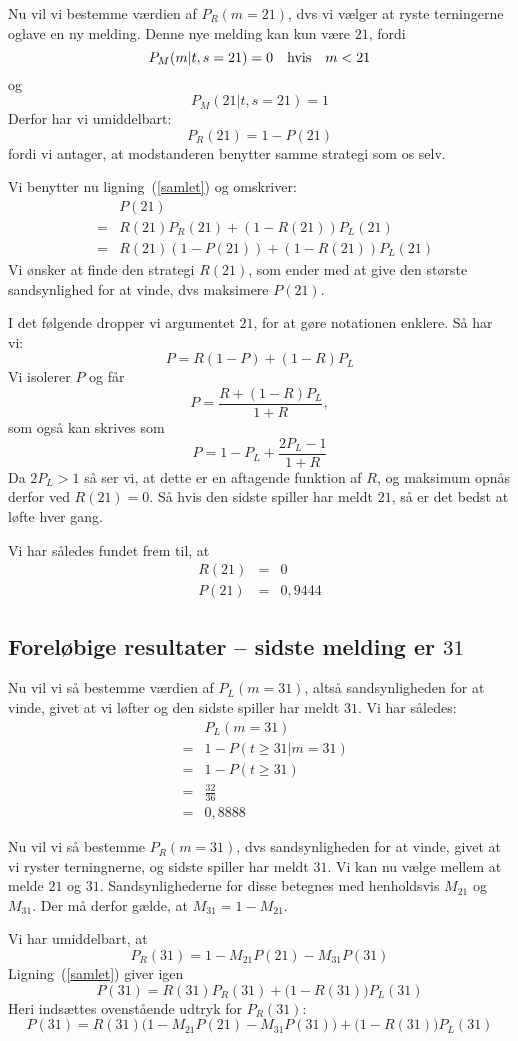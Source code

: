 \documentclass[12pt,oneside,a4paper]{article}
\newcommand{\bas}{\begin{eqnarray*}}
\newcommand{\eas}{\end{eqnarray*}}
\begin{document}
Nu vil vi bestemme værdien af $P_R(m=21)$, dvs vi vælger at ryste terningerne
oglave en ny melding. Denne nye melding kan kun være $21$,
fordi
$$
P_M(m|t, s=21) = 0 \quad {\rm hvis} \quad m < 21
$$
og
$$
P_M(21|t, s=21) = 1
$$
Derfor har vi umiddelbart:
$$
P_R(21) = 1 - P(21)
$$
fordi vi antager, at modstanderen benytter samme strategi som os selv.

Vi benytter nu ligning~(\ref{samlet}) og omskriver:
\bas
 && P(21) \\
&=& R(21) P_R(21) + (1-R(21)) P_L(21) \\ 
&=& R(21) (1-P(21)) + (1-R(21)) P_L(21)
\eas
Vi ønsker at finde den strategi $R(21)$, som ender med at give den største
sandsynlighed for at vinde, dvs maksimere $P(21)$.

I det følgende dropper vi argumentet $21$, for at gøre notationen enklere.
Så har vi:
$$
P = R(1-P) + (1-R)P_L
$$
Vi isolerer $P$ og får
$$
P = \frac{R+(1-R)P_L}{1+R},
$$
som også kan skrives som
$$
P = 1 - P_L + \frac{2P_L-1}{1+R}
$$
Da $2P_L>1$ så ser vi, at dette er en aftagende funktion af $R$, og maksimum
opnås derfor ved $R(21) = 0$. Så hvis den sidste spiller har meldt $21$, så er
det bedst at løfte hver gang.

Vi har således fundet frem til, at
\bas
R(21) &=& 0 \\
P(21) &=& 0,9444
\eas

\subsection{Foreløbige resultater -- sidste melding er $31$}
Nu vil vi så bestemme værdien af $P_L(m=31)$, altså sandsynligheden for at
vinde, givet at vi løfter og den sidste spiller har meldt $31$.
Vi har således:
\bas
 && P_L(m=31) \\
&=& 1 - P(t \ge 31 | m=31) \\
&=& 1 - P(t \ge 31) \\
&=& \frac{32}{36} \\
&=& 0,8888
\eas

Nu vil vi så bestemme $P_R(m=31)$, dvs sandsynligheden for at vinde, givet at 
vi ryster terningnerne, og sidste spiller har meldt $31$. Vi kan nu vælge mellem
at melde $21$ og $31$. Sandsynlighederne for disse betegnes med henholdsvis $M_{21}$
og $M_{31}$. Der må derfor gælde, at $M_{31} = 1-M_{21}$.

Vi har umiddelbart, at
$$
P_R(31) = 1 - M_{21} P(21) - M_{31} P(31)
$$
Ligning~(\ref{samlet}) giver igen
$$
P(31) = R(31) P_R(31) + \big(1-R(31)\big) P_L(31)
$$
Heri indsættes ovenstående udtryk for $P_R(31)$:
$$
P(31) = R(31) \big(1 - M_{21} P(21) - M_{31} P(31)\big) + \big(1-R(31)\big) P_L(31)
$$
\end{document}
